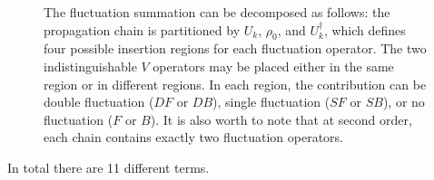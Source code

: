\documentclass{notes2}
\begin{document}
\begin{figure}[h]
    \centering

\caption{The fluctuation summation can be decomposed as follows: the propagation chain is partitioned by $U_k$, $\rho_0$, and $U_k^\dagger$, which defines four possible insertion regions for each fluctuation operator. The two indistinguishable $V$ operators may be placed either in the same region or in different regions. In each region, the contribution can be double fluctuation ($DF$ or $DB$), single fluctuation ($SF$ or $SB$), or no fluctuation ($F$ or $B$). It is also worth to note that at second order, each chain contains exactly two fluctuation operators. }
\end{figure}
In total there are 11 different terms.
\end{document}
